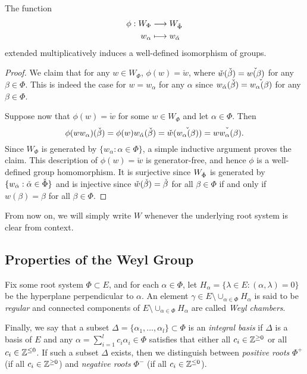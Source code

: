 \begin{proposition}
    The function
    \begin{align*}
        \phi:W_{\Phi}&\longrightarrow W_{\check{\Phi}}\\
        w_\alpha&\longmapsto w_{\check{\alpha}}
    \end{align*}
    extended multiplicatively induces a well-defined isomorphism of groups.
\end{proposition}
\begin{proof}
    We claim that for any $w\in W_\Phi$, $\phi(w)=\check{w}$, where $\check{w}(\check{\beta})=\check{w(\beta)}$ for any $\beta\in\Phi$. This is indeed the case for $w=w_\alpha$ for any $\alpha$ since $w_{\check{\alpha}}(\check{\beta})=\check{w_\alpha(\beta)}$ for any $\beta\in\Phi$. 
    
    Suppose now that $\phi(w)=\check{w}$ for some $w\in W_\Phi$ and let $\alpha\in\Phi$. Then $$\phi(ww_\alpha)(\check{\beta})=\phi(w)w_{\check{\alpha}}(\check{\beta})=\check{w}(\check{w_\alpha(\beta)})=\check{ww_\alpha(\beta)}.$$
    Since $W_\Phi$ is generated by $\{w_\alpha:\alpha\in\Phi\}$, a simple inductive argument proves the claim. This description of $\phi(w)=\check{w}$ is generator-free, and hence $\phi$ is a well-defined group homomorphism. It is surjective since $W_{\check{\Phi}}$ is generated by $\{w_{\check{\alpha}}:\check{\alpha}\in\check{\Phi}\}$ and is injective since $\check{w}(\check{\beta})=\check{\beta}$ for all $\beta\in\Phi$ if and only if $w(\beta)=\beta$ for all $\beta\in\Phi$.
\end{proof}

From now on, we will simply write $W$ whenever the underlying root system is clear from context.

\subsection{Properties of the Weyl Group}

Fix some root system $\Phi\subset E$, and for each $\alpha\in\Phi$, let $H_\alpha=\{\lambda\in E:(\alpha,\lambda)=0\}$ be the hyperplane perpendicular to $\alpha$. An element $\gamma\in E\setminus\cup_{\alpha\in\Phi}H_\alpha$ is said to be \textit{regular} and connected components of $E\setminus\cup_{\alpha\in\Phi}H_\alpha$ are called \textit{Weyl chambers}. 

Finally, we say that a subset $\Delta=\{\alpha_1,\ldots,\alpha_l\}\subset\Phi$ is an \textit{integral basis} if $\Delta$ is a basis of $E$ and any $\alpha=\sum_{i=1}^l c_i\alpha_i\in\Phi$ satisfies that either all $c_i\in\mathbb{Z}^{\geq 0}$ or all $c_i\in\mathbb{Z}^{\leq 0}$. If such a subset $\Delta$ exists, then we distinguish between \textit{positive roots} $\Phi^+$ (if all $c_i\in\mathbb{Z}^{\geq0}$) and \textit{negative roots} $\Phi^-$ (if all $c_i\in\mathbb{Z}^{\leq0}$).

